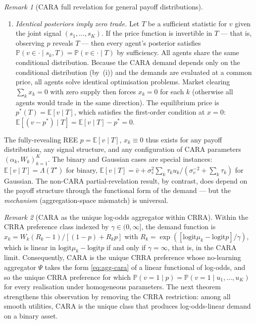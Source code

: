 \documentclass[12pt,letterpaper]{article}
\theoremstyle{definition}
\theoremstyle{remark}
\newtheorem{remark}{Remark}
\newcommand{\E}{\mathbb{E}}
\newcommand{\PP}{\mathbb{P}}
\newcommand{\Lam}{\Lambda}            %
\newcommand{\logit}{\mathrm{logit}}
\newcommand{\Tstar}{T^{\!\star}}
\newcommand{\1}{\mathbf{1}}
\begin{document}
\begin{remark}[CARA full revelation for general payoff distributions]
\begin{enumerate}[label=(\roman*),topsep=2pt,itemsep=2pt]
\item \emph{Identical posteriors imply zero trade.}  Let $T$ be a
sufficient statistic for $v$ given the joint signal
$(s_{1},\ldots,s_{K})$.  If the price function is invertible in $T$
--- that is, observing $p$ reveals $T$ --- then every agent's posterior
satisfies $\PP(v \in \cdot \mid s_{k}, T) = \PP(v \in \cdot \mid T)$
by sufficiency.  All agents share the same conditional distribution.
Because the CARA demand depends only on the conditional distribution
(by~(i)) and the demands are evaluated at a common price, all agents
solve identical optimisation problems.  Market clearing
$\sum_{k}x_{k}=0$ with zero supply then forces $x_{k}=0$ for each $k$
(otherwise all agents would trade in the same direction).  The
equilibrium price is $p^{*}(T) = \E[v \mid T]$, which satisfies the
first-order condition at $x=0$:
$\E[(v-p^{*})\mid T] = \E[v\mid T]-p^{*} = 0$.
\end{enumerate}
The fully-revealing REE $p=\E[v\mid T]$, $x_{k}\equiv 0$ thus exists
for any payoff distribution, any signal structure, and any
configuration of CARA parameters $(\alpha_{k},W_{k})_{k=1}^{K}$.  The
binary and Gaussian cases are special instances: $\E[v\mid T] =
\Lam(\Tstar)$ for binary, $\E[v\mid T] = \bar v + \sigma_{v}^{2}
\sum_{k}\tau_{k}u_{k}/(\sigma_{v}^{-2}+\sum_{k}\tau_{k})$ for
Gaussian.  The non-CARA partial-revelation result, by contrast, does
depend on the payoff structure through the functional form of the
demand --- but the \emph{mechanism} (aggregation-space mismatch) is
universal.
\end{remark}

\begin{remark}[CARA as the unique log-odds aggregator within CRRA]\label{rem:unique-cara}
Within the CRRA preference class indexed by $\gamma\in(0,\infty]$, the
demand function is $x_{k}=W_{k}(R_{k}-1)/[(1-p)+R_{k}p]$ with
$R_{k}=\exp([\logit\mu_{k}-\logit p]/\gamma)$, which is linear in
$\logit\mu_{k}-\logit p$ if and only if $\gamma=\infty$, that is, in the
CARA limit. Consequently, CARA is the unique CRRA preference whose
no-learning aggregator $\Psi$ takes the form \eqref{eq:agg-cara} of a
linear functional of log-odds, and so the unique CRRA preference for which
\(\PP(v=1\mid p)=\PP(v=1\mid u_{1},\ldots,u_{K})\) for every realisation
under homogeneous parameters. The next theorem strengthens this
observation by removing the CRRA restriction: among all smooth utilities,
CARA is the unique class that produces log-odds-linear demand on a
binary asset.
\end{remark}
\end{document}
